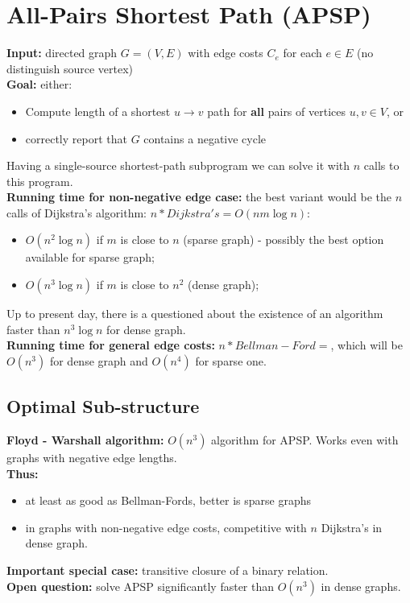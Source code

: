 \documentclass{scrartcl}
\begin{document}
\section{All-Pairs Shortest Path (APSP)}
\label{sec:15-1} {\bf Input: } directed graph $G = (V, E)$ with edge costs $C_e$
for each $e \in
E$ (no distinguish source vertex)\\
{\bf Goal: } either:
\begin{itemize}
\item Compute length of a shortest $u \rightarrow v$ path for {\bf all } pairs
  of vertices $u, v \in V$, or
\item correctly report that $G$ contains a negative cycle
\end{itemize}
Having a single-source shortest-path subprogram we can solve it with $n$ calls
to this program.\\
{\bf Running time for non-negative edge case:} the best variant would be the $n$
calls of Dijkstra's algorithm: $n * Dijkstra's = O(n m \log n)$:
\begin{itemize}
\item $O(n^2 \log n)$ if $m$ is close to $n$ (sparse graph) - possibly the best
  option available for sparse graph;
\item $O(n^3 \log n)$ if $m$ is close to $n^2$ (dense graph);
\end{itemize}
Up to present day, there is a questioned about the existence of an algorithm
faster than $n^3 \log n$ for dense graph.\\
{\bf Running time for general edge costs: } $n * Bellman-Ford = $, which will be
$O(n^3)$ for dense graph and $O(n^4)$ for sparse one.

\subsection{Optimal Sub-structure}
\label{sec:15-2} {\bf Floyd - Warshall algorithm: } $O(n^3)$ algorithm for APSP.
Works even with graphs with negative edge lengths.\\
{\bf Thus: }
\begin{itemize}
\item at least as good as Bellman-Fords, better is sparse graphs
\item in graphs with non-negative edge costs, competitive with $n$ Dijkstra's in
  dense graph.
\end{itemize}
{\bf Important special case: } transitive closure of a binary relation.\\
{\bf Open question: } solve APSP significantly faster than $O(n^3)$ in dense
graphs.
\end{document}
